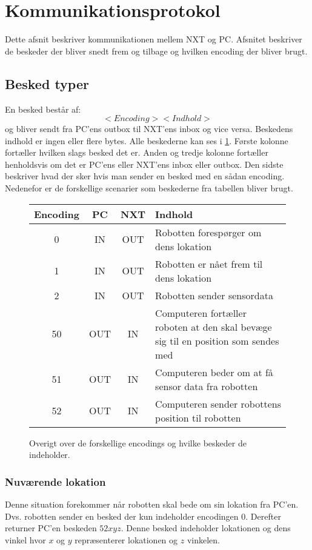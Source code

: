 \section{Kommunikationsprotokol}
Dette afsnit beskriver kommunikationen mellem NXT og PC.
Afsnitet beskriver de beskeder der bliver snedt frem og tilbage og hvilken encoding der bliver brugt.

\subsection{Besked typer}
En besked består af:
\begin{equation}
<Encoding><Indhold>
\end{equation}
og bliver sendt fra PC'ens outbox til NXT'ens inbox og vice versa.
Beskedens indhold er ingen eller flere bytes.
Alle beskederne kan ses i \cref{design:protokol_tabel}.
Første kolonne fortæller hvilken slags besked det er.
Anden og tredje kolonne fortæller henholdsvis om det er PC'ens eller NXT'ens inbox eller outbox.
Den sidste beskriver hvad der sker hvis man sender en besked med en sådan encoding.
Nedenefor er de forskellige scenarier som beskederne fra tabellen bliver brugt.

\begin{figure}[H]
\begin{longtable}{ c | c | c | p{}}
Encoding & PC & NXT & Indhold\\
\hline
\hline
0 & IN & OUT & Robotten forespørger om dens lokation \\
1 & IN & OUT & Robotten er nået frem til dens lokation \\
2 & IN & OUT & Robotten sender sensordata \\
50 & OUT & IN & Computeren fortæller roboten at den skal bevæge sig til en position som sendes med\\
51 & OUT & IN & Computeren beder om at få sensor data fra robotten \\
52 & OUT & IN & Computeren sender robottens position til robotten \\
\end{longtable}
\label{design:protokol_tabel}
\caption{Overigt over de forskellige encodings og hvilke beskeder de indeholder.}
\end{figure}

\subsubsection{Nuværende lokation}
Denne situation forekommer når robotten skal bede om sin lokation fra PC'en.
Dvs. robotten sender en besked der kun indeholder encodingen $0$.
Derefter returner PC'en beskeden $52xyz$.
Denne besked indeholder lokationen og dens vinkel hvor $x$ og $y$ repræsenterer lokationen og $z$ vinkelen.


